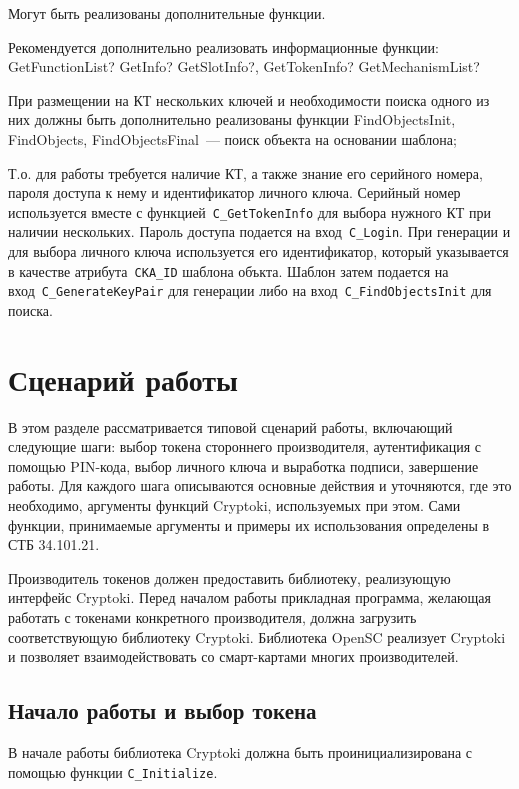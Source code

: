 Могут быть реализованы дополнительные функции. 

Рекомендуется дополнительно реализовать информационные функции:
GetFunctionList? GetInfo? GetSlotInfo?, GetTokenInfo? GetMechanismList?

При размещении на КТ нескольких ключей и необходимости поиска одного из 
них должны быть дополнительно реализованы функции FindObjectsInit, FindObjects, 
FindObjectsFinal~--- поиск объекта на основании шаблона;

Т.о. для работы требуется наличие КТ, а также знание его
серийного номера, пароля доступа к нему и идентификатор личного ключа.
Серийный номер используется вместе с функцией~\verb|C_GetTokenInfo|
для выбора нужного КТ при наличии нескольких.
Пароль доступа подается на вход~\verb|C_Login|.
При генерации и для выбора личного ключа
используется его идентификатор, который указывается
в качестве атрибута~\verb|CKA_ID| шаблона объкта.
Шаблон затем подается на вход~\verb|C_GenerateKeyPair|
для генерации либо на вход~\verb|C_FindObjectsInit| для
поиска.
\fi

\section{Сценарий работы}

В этом разделе рассматривается типовой сценарий работы,
включающий следующие шаги: выбор токена стороннего
производителя, аутентификация с помощью PIN-кода, выбор
личного ключа и выработка подписи, завершение работы.
Для каждого шага описываются основные действия и
уточняются, где это необходимо, аргументы функций Cryptoki,
используемых при этом.
Сами функции, принимаемые аргументы и примеры
их использования определены в СТБ 34.101.21.

Производитель токенов должен предоставить библиотеку,
реализующую интерфейс Cryptoki. Перед началом работы прикладная
программа, желающая работать с токенами конкретного
производителя, должна загрузить соответствующую библиотеку
Cryptoki. Библиотека OpenSC реализует Cryptoki и позволяет
взаимодействовать со смарт-картами многих производителей.

\subsection{Начало работы и выбор токена}

В начале работы библиотека Cryptoki должна быть
проинициализирована с помощью функции \verb|C_Initialize|.

